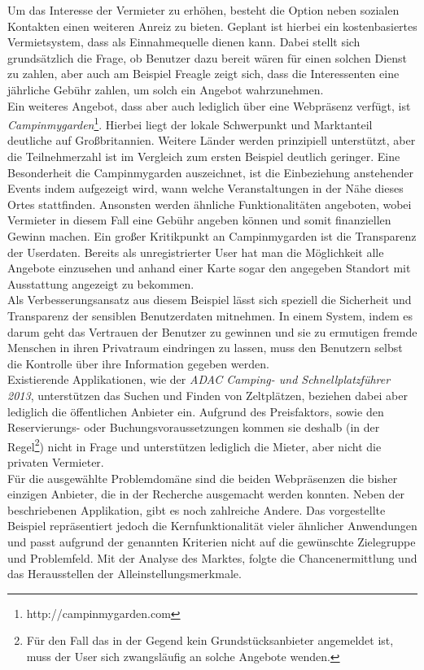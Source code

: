     Um das Interesse der Vermieter zu erhöhen, besteht die Option neben sozialen Kontakten einen weiteren Anreiz zu bieten. Geplant ist hierbei ein kostenbasiertes Vermietsystem, dass als Einnahmequelle dienen kann. Dabei stellt sich grundsätzlich die Frage, ob Benutzer dazu bereit wären für einen solchen Dienst zu zahlen, aber auch am Beispiel Freagle zeigt sich, dass die Interessenten eine jährliche Gebühr zahlen, um solch ein Angebot wahrzunehmen.\\
    
    Ein weiteres Angebot, dass aber auch lediglich über eine Webpräsenz verfügt, ist \textit{Campinmygarden}\footnote{http://campinmygarden.com}. Hierbei liegt der lokale Schwerpunkt und Marktanteil deutliche auf Großbritannien. Weitere Länder werden prinzipiell unterstützt, aber die Teilnehmerzahl ist im Vergleich zum ersten Beispiel deutlich geringer.
    Eine Besonderheit die Campinmygarden auszeichnet, ist die Einbeziehung anstehender Events indem aufgezeigt wird, wann welche Veranstaltungen in der Nähe dieses Ortes stattfinden. Ansonsten werden ähnliche Funktionalitäten angeboten, wobei Vermieter in diesem Fall eine Gebühr angeben können und somit finanziellen Gewinn machen. Ein großer Kritikpunkt an Campinmygarden ist die Transparenz der Userdaten. Bereits als unregistrierter User hat man die Möglichkeit alle Angebote einzusehen und anhand einer Karte sogar den angegeben Standort mit Ausstattung angezeigt zu bekommen.\\
    Als Verbesserungsansatz aus diesem Beispiel lässt sich speziell die Sicherheit und Transparenz der sensiblen Benutzerdaten mitnehmen. 
    In einem System, indem es darum geht das Vertrauen der Benutzer zu gewinnen und sie zu ermutigen fremde Menschen in ihren Privatraum eindringen zu lassen, muss den Benutzern selbst die Kontrolle über ihre Information gegeben werden.\\

    Existierende Applikationen, wie der \textit{ADAC Camping- und Schnellplatzführer 2013}, unterstützen das Suchen und Finden von Zeltplätzen, beziehen dabei aber lediglich die öffentlichen Anbieter ein. Aufgrund des Preisfaktors, sowie den Reservierungs- oder Buchungsvoraussetzungen kommen sie deshalb (in der Regel\footnote{Für den Fall das in der Gegend kein Grundstücksanbieter angemeldet ist, muss der User sich zwangsläufig an solche Angebote wenden. }) nicht in Frage und unterstützen lediglich die Mieter, aber nicht die privaten Vermieter.\\

    Für die ausgewählte Problemdomäne sind die beiden Webpräsenzen die bisher einzigen Anbieter, die in der Recherche ausgemacht werden konnten. Neben der beschriebenen Applikation, gibt es noch zahlreiche Andere. Das vorgestellte Beispiel repräsentiert jedoch die Kernfunktionalität vieler ähnlicher Anwendungen und passt aufgrund der genannten Kriterien nicht auf die gewünschte Zielegruppe und Problemfeld. 
    Mit der Analyse des Marktes, folgte die Chancenermittlung und das Herausstellen der Alleinstellungsmerkmale.


